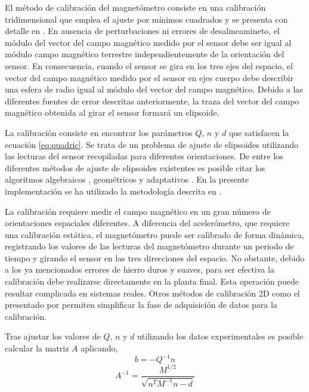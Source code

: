 \documentclass[a4paper,12pt]{book}
\begin{document}
El método de calibración del magnetómetro consiste en una calibración tridimensional que emplea el ajuste por mínimos cuadrados y se presenta con detalle en \cite{kok2012calibration, renaudin2010complete, magnusson2013state}. En ausencia de perturbaciones ni errores de desalineamineto, el módulo del vector del campo magnético medido por el sensor debe ser igual al módulo campo magnético terrestre independientemente de la orientación del sensor. En consecuencia, cuando el sensor se gira en los tres ejes del espacio, el vector del campo magnético medido por el sensor en ejes cuerpo debe describir una esfera de radio igual al módulo del vector del campo magnético. Debido a las diferentes fuentes de error descritas anteriormente, la traza del vector del campo magnético obtenida al girar el sensor formará un elipsoide. 


La calibración consiste en encontrar los parámetros $Q$, $n$ y $d$ que satisfacen la ecuación \eqref{eq:quadric}. Se trata de un problema de ajuste de elipsoides utilizando las lecturas del sensor recopiladas para diferentes orientaciones. De entre los diferentes métodos de ajuste de elipsoides existentes es posible citar los algoritmos algebraicos \cite{li2004least, fitzgibbon1999direct}, geométricos \cite{cheng1999statistical} y adaptativos \cite{markovsky2004consistent}. En la presente implementación se ha utilizado la metodología descrita en \cite{li2004least}. 

 La calibración requiere medir el campo magnético en un gran número de orientaciones espaciales diferentes. A diferencia del acelerómetro, que requiere una calibración estática, el magnetómetro puede ser calibrado de forma dinámica, registrando los valores de las lecturas del magnetómetro durante un periodo de tiempo y girando el sensor en las tres direcciones del espacio. No obstante, debido a los ya mencionados errores de hierro duros y suaves, para ser efectiva la calibración debe realizarse directamente en la planta final. Esta operación puede resultar complicada en sistemas reales. Otros métodos de calibración 2D como el presentado por \cite{caruso1998applications} permiten simplificar la fase de adquisición de datos para la calibración.

Tras ajustar los valores de $Q$, $n$ y $d$ utilizando los datos experimentales es posible calcular la matriz $A$ aplicando,
\begin{equation}
    b=-Q^{-1}n
\end{equation}
\begin{equation}
    A^{-1}= \frac{M^{1/2}}{\sqrt{n^{T}M^{-1}n-d}}
\end{equation}
\end{document}
